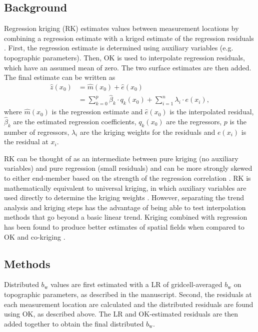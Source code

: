\documentclass[onecolumn, letterpaper]{igs}
\begin{document}
\subsection{Background}

Regression kriging (RK) estimates values between measurement locations by combining a regression estimate with a kriged estimate of the regression residuals \citep{Hengl2007}. First, the regression estimate is determined using auxiliary variables (e.g. topographic parameters). Then, OK is used to interpolate regression residuals, which have an assumed mean of zero. The two surface estimates are then added. The final estimate can be written as 
\begin{align}
\hat{z}(x_0) &= \hat{m}(x_0) + \hat{e}(x_0)\\
& = \sum^p_{k=0}\hat{\beta}_k \cdot	q_k(x_0)+ \sum_{i=1}^{n} \lambda_i \cdot e(x_i),
\end{align}
where $\hat{m}(x_0)$ is the regression estimate and $\hat{e}(x_0)$ is the interpolated residual, $\hat{\beta}_k$ are the estimated regression coefficients, $q_k(x_0)$ are the regressors, $p$ is the number of regressors, $\lambda_i$ are the kriging weights for the residuals and $e(x_i)$ is the residual at $x_i$. 

RK can be thought of as an intermediate between pure kriging (no auxiliary variables) and pure regression (small residuals) and can be more strongly skewed to either end-member based on the strength of the regression correlation \citep{Hengl2007}. RK is mathematically equivalent to universal kriging, in which auxiliary variables are used directly to determine the kriging weights \citep{Hengl2007}. However, separating the trend analysis and kriging steps has the advantage of being able to test interpolation methods that go beyond a basic linear trend. Kriging combined with regression has been found to produce better estimates of spatial fields when compared to OK and co-kriging \citep[e.g.][]{Knotters1995}.

\subsection{Methods}

Distributed $b_\mathrm{w}$ values are first estimated with a LR of gridcell-averaged $b_\mathrm{w}$ on topographic parameters, as described in the manuscript. Second, the residuals at each measurement location are calculated and the distributed residuals are found using OK, as described above. The LR and OK-estimated residuals are then added together to obtain the final distributed $b_\mathrm{w}$. 
\end{document}
